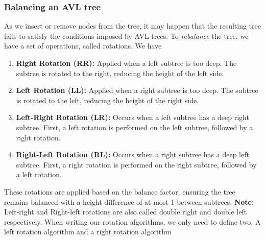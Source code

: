 \documentclass{report}
\begin{document}
\bigbreak \noindent 
\subsubsection{Balancing an AVL tree}
\bigbreak \noindent 
As we insert or remove nodes from the tree, it may happen that the resulting tree fails to satisfy the conditions imposed by AVL trees. To \textit{rebalance} the tree, we have a set of operations, called rotations. We have
\bigbreak \noindent 
\begin{enumerate}
    \item \textbf{Right Rotation (RR):} Applied when a left subtree is too deep. The subtree is rotated to the right, reducing the height of the left side.
    \item \textbf{Left Rotation (LL):} Applied when a right subtree is too deep. The subtree is rotated to the left, reducing the height of the right side.
    \item \textbf{Left-Right Rotation (LR):} Occurs when a left subtree has a deep right subtree. First, a left rotation is performed on the left subtree, followed by a right rotation.
    \item \textbf{Right-Left Rotation (RL):} Occurs when a right subtree has a deep left subtree. First, a right rotation is performed on the right subtree, followed by a left rotation.
\end{enumerate}
These rotations are applied based on the balance factor, ensuring the tree remains balanced with a height difference of at most 1 between subtrees.
\bigbreak \noindent 
\textbf{Note:} Left-right and Right-left rotations are also called double right and double left respectively.
\bigbreak \noindent 
When writing our rotation algorithms, we only need to define two. A left rotation algorithm and a right rotation algorithm

\pagebreak 
\end{document}
